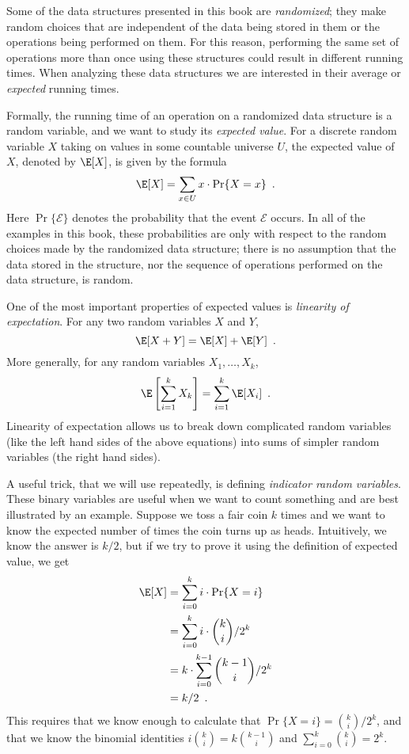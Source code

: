%
%
%
%
Some of the data structures presented in this book are \emph{randomized};
they make random choices that are independent of the data being stored
in them or the operations being performed on them.  For this reason,
performing the same set of operations more than once using these
structures could result in different running times.  When analyzing these
data structures we are interested in their average or \emph{expected}
running times.
%
%

Formally, the running time of an operation on a randomized data structure
is a random variable, and we want to study its \emph{expected value}.
%
For
a discrete random variable $X$ taking on values in some countable
universe $U$, the expected value of $X$, denoted by $\E[X]$, is given
by the formula
\[
    \E[X] = \sum_{x\in U} x\cdot\Pr\{X=x\} \enspace .
\]
Here $\Pr\{\mathcal{E}\}$ denotes the probability that the event
$\mathcal{E}$ occurs.  In all of the examples in this book, these
probabilities are only with respect to the random choices made by the
randomized data structure;  there is no assumption that the data stored
in the structure, nor the sequence of operations performed on the
data structure, is random.

One of the most important properties of expected values is \emph{linearity
of expectation}.
%
For any two random variables $X$ and $Y$,
\[
   \E[X+Y] = \E[X] + \E[Y] \enspace .
\]
More generally, for any random variables $X_1,\ldots,X_k$,
\[
   \E\left[\sum_{i=1}^k X_k\right] = \sum_{i=1}^k \E[X_i] \enspace .
\]
Linearity of expectation allows us to break down complicated random variables (like the left hand sides of the above equations) into sums of simpler random variables (the right hand sides).

A useful trick, that we will use repeatedly, is defining \emph{indicator
random variables}.
%
These binary variables are useful when we want to
count something and are best illustrated by an example.  Suppose we toss
a fair coin $k$ times and we want to know the expected number of times
the coin turns up as heads.
%
Intuitively, we know the answer is $k/2$,
but if we try to prove it using the definition of expected value, we get
\begin{align*}
   \E[X] & = \sum_{i=0}^k i\cdot\Pr\{X=i\} \\
         & = \sum_{i=0}^k i\cdot\binom{k}{i}/2^k \\
         & = k\cdot \sum_{i=0}^{k-1}\binom{k-1}{i}/2^k \\
         & = k/2 \enspace .
\end{align*}
This requires that we know enough to calculate that $\Pr\{X=i\}
= \binom{k}{i}/2^k$, and that we know the binomial identities
$i\binom{k}{i}=k\binom{k-1}{i}$ and $\sum_{i=0}^{k} \binom{k}{i} = 2^{k}$.

